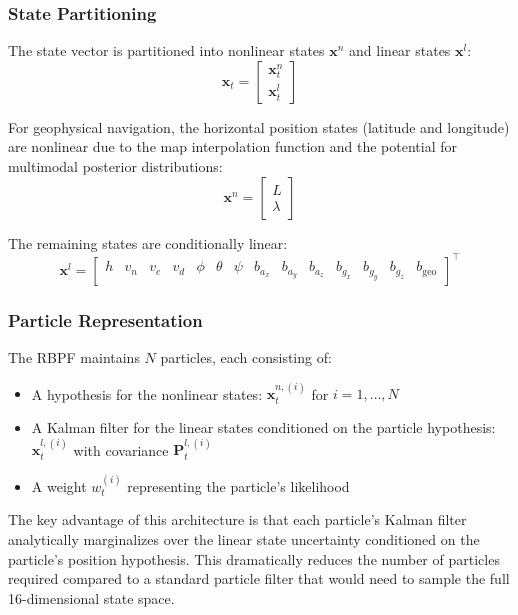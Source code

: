 \documentclass[letterpaper,times]{IONconf}
\begin{document}
\subsubsection{State Partitioning}

The state vector is partitioned into nonlinear states \(\mathbf{x}^n\) and linear states \(\mathbf{x}^l\):
\begin{equation}
\mathbf{x}_t = \begin{bmatrix} \mathbf{x}^n_t \\ \mathbf{x}^l_t \end{bmatrix}
\end{equation}

For geophysical navigation, the horizontal position states (latitude and longitude) are nonlinear due to the map interpolation function and the potential for multimodal posterior distributions:
\begin{equation}
\mathbf{x}^n = \begin{bmatrix} L \\ \lambda \end{bmatrix}
\end{equation}

The remaining states are conditionally linear:
\begin{equation}
\mathbf{x}^l = \left[\begin{array}{cccccccccccccc} h & v_n & v_e & v_d & \phi & \theta & \psi & b_{a_x} & b_{a_y} & b_{a_z} & b_{g_x} & b_{g_y} & b_{g_z} & b_{\text{geo}} \end{array}\right]^\intercal
\end{equation}

\subsubsection{Particle Representation}

The RBPF maintains \(N\) particles, each consisting of:
\begin{itemize}
    \item A hypothesis for the nonlinear states: \(\mathbf{x}^{n,(i)}_t\) for \(i = 1, \ldots, N\)
    \item A Kalman filter for the linear states conditioned on the particle hypothesis: \(\mathbf{x}^{l,(i)}_t\) with covariance \(\mathbf{P}^{l,(i)}_t\)
    \item A weight \(w^{(i)}_t\) representing the particle's likelihood
\end{itemize}

The key advantage of this architecture is that each particle's Kalman filter analytically marginalizes over the linear state uncertainty conditioned on the particle's position hypothesis. This dramatically reduces the number of particles required compared to a standard particle filter that would need to sample the full 16-dimensional state space.
\end{document}
